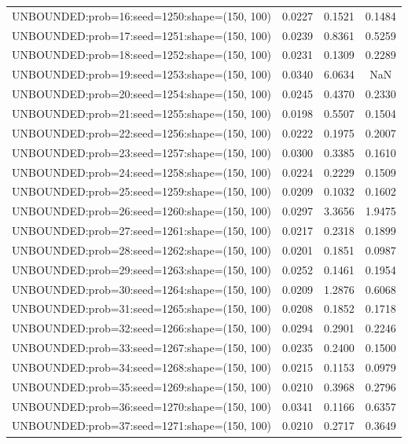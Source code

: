 \begin{longtable}{lccc}
UNBOUNDED:prob=16:seed=1250:shape=(150, 100)  &   0.0227 &  0.1521 &  0.1484 \\
UNBOUNDED:prob=17:seed=1251:shape=(150, 100)  &   0.0239 &  0.8361 &  0.5259 \\
UNBOUNDED:prob=18:seed=1252:shape=(150, 100)  &   0.0231 &  0.1309 &  0.2289 \\
UNBOUNDED:prob=19:seed=1253:shape=(150, 100)  &   0.0340 &  6.0634 &     NaN \\
UNBOUNDED:prob=20:seed=1254:shape=(150, 100)  &   0.0245 &  0.4370 &  0.2330 \\
UNBOUNDED:prob=21:seed=1255:shape=(150, 100)  &   0.0198 &  0.5507 &  0.1504 \\
UNBOUNDED:prob=22:seed=1256:shape=(150, 100)  &   0.0222 &  0.1975 &  0.2007 \\
UNBOUNDED:prob=23:seed=1257:shape=(150, 100)  &   0.0300 &  0.3385 &  0.1610 \\
UNBOUNDED:prob=24:seed=1258:shape=(150, 100)  &   0.0224 &  0.2229 &  0.1509 \\
UNBOUNDED:prob=25:seed=1259:shape=(150, 100)  &   0.0209 &  0.1032 &  0.1602 \\
UNBOUNDED:prob=26:seed=1260:shape=(150, 100)  &   0.0297 &  3.3656 &  1.9475 \\
UNBOUNDED:prob=27:seed=1261:shape=(150, 100)  &   0.0217 &  0.2318 &  0.1899 \\
UNBOUNDED:prob=28:seed=1262:shape=(150, 100)  &   0.0201 &  0.1851 &  0.0987 \\
UNBOUNDED:prob=29:seed=1263:shape=(150, 100)  &   0.0252 &  0.1461 &  0.1954 \\
UNBOUNDED:prob=30:seed=1264:shape=(150, 100)  &   0.0209 &  1.2876 &  0.6068 \\
UNBOUNDED:prob=31:seed=1265:shape=(150, 100)  &   0.0208 &  0.1852 &  0.1718 \\
UNBOUNDED:prob=32:seed=1266:shape=(150, 100)  &   0.0294 &  0.2901 &  0.2246 \\
UNBOUNDED:prob=33:seed=1267:shape=(150, 100)  &   0.0235 &  0.2400 &  0.1500 \\
UNBOUNDED:prob=34:seed=1268:shape=(150, 100)  &   0.0215 &  0.1153 &  0.0979 \\
UNBOUNDED:prob=35:seed=1269:shape=(150, 100)  &   0.0210 &  0.3968 &  0.2796 \\
UNBOUNDED:prob=36:seed=1270:shape=(150, 100)  &   0.0341 &  0.1166 &  0.6357 \\
UNBOUNDED:prob=37:seed=1271:shape=(150, 100)  &   0.0210 &  0.2717 &  0.3649 \\

\end{longtable}
